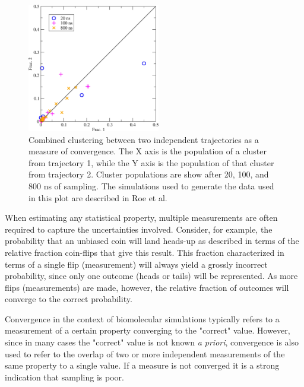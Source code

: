 \begin{figure}
  \includegraphics[width=5.8cm]{figures/combinedcluster}
  \caption{
  \label{f:combinedcluster} Combined clustering between two independent trajectories as a measure of convergence. The X axis is the population of a cluster from trajectory 1, while the Y axis is the population of that cluster from trajectory 2. Cluster populations are show after 20, 100, and 800 ns of sampling. The simulations used to generate the data used in this plot are described in Roe et al.\citep{Roe2014}
  }
\end{figure}

When estimating any statistical property, multiple measurements are often required to capture the uncertainties involved. Consider, for example, the probability that an unbiased coin will land heads-up as described in terms of the relative fraction coin-flips that give this result.  This fraction characterized in terms of a single flip (measurement) will always yield a grossly incorrect probability, since only one outcome (heads or tails) will be represented. As more flips (measurements) are made, however, the relative fraction of outcomes will converge to the correct probability.  


Convergence in the context of biomolecular simulations typically refers to a measurement of a certain property converging to the "correct" value. However, since in many cases the "correct" value is not known \emph{a priori}, convergence is also used to refer to the overlap of two or more independent measurements of the same property to a single value.
 If a measure is not converged it is a strong indication that sampling is poor. 
 
